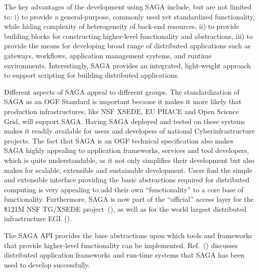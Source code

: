 \documentclass{sig-alternate}
\begin{document}

The key advantages of the development using SAGA include, but are not
limited to: i) to provide a general-purpose, commonly used yet
standardized functionality, while hiding complexity of heterogeneity
of back-end resources, ii) to provide building blocks for constructing
higher-level functionality and abstractions, iii) to provide the means
for developing broad range of distributed applications such as
gateways, workflows, application management systems, and runtime
environments. Interestingly, SAGA provides an integrated, light-weight
approach to support scripting for building distributed applications.

Different aspects of SAGA appeal to different groups. The
standardization of SAGA as an OGF Standard is important because it
makes it more likely that production infrastructures, like NSF XSEDE,
EU PRACE and Open Science Grid, will support SAGA. Having SAGA
deployed and tested on these systems makes it readily available for
users and developers of national Cyberinfrastructure projects. The
fact that SAGA is an OGF technical specification also makes SAGA
highly appealing to application frameworks, services and tool
developers, which is quite understandable, as it not only simplifies
their development but also makes for scalable, extensible and
sustainable development. Users find the simple and extensible
interface providing the basic abstractions required for distributed
computing is very appealing to add their own ``functionality'' to a
core base of functionality. Furthermore, SAGA is now part of the
``official'' access layer for the \$121M NSF TG/XSEDE
project~(\cite{xsede_url}), as well as for the world largest distributed
infrastructure EGI~(\cite{egi_url}).

The SAGA API provides the base abstractions upon which tools and
frameworks that provide higher-level functionality can be
implemented. Ref.~(\cite{saga_url}) discusses distributed application
frameworks and run-time systems that SAGA has been used to develop
successfully. 
\end{document}
